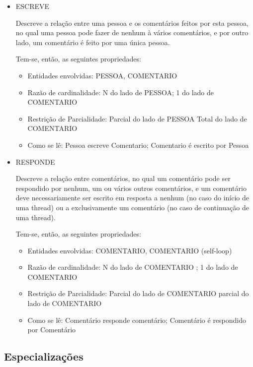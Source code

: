 \begin{itemize}
				\item ESCREVE

Descreve a relação entre uma pessoa e os comentários feitos por esta pessoa, no qual uma pessoa pode fazer de nenhum à vários comentários, e por outro lado, um comentário é feito por uma única pessoa.

Tem-se, então, as seguintes propriedades:
\begin{itemize}

\item Entidades envolvidas: PESSOA, COMENTARIO
\item Razão de cardinalidade: N do lado de PESSOA; 1 do lado de COMENTARIO
\item Restrição de Parcialidade: Parcial do lado de PESSOA                        Total do lado de COMENTARIO
\item Como se lê: Pessoa escreve Comentario; Comentario é escrito por Pessoa
\end{itemize}
\end{itemize}

\begin{itemize}
				\item RESPONDE

Descreve a relação entre comentários, no qual um comentário pode ser respondido por nenhum, um ou vários outros comentários, e um comentário deve necessariamente ser escrito em resposta a nenhum (no caso do início de uma thread) ou a exclusivamente um comentário (no caso de continuação de uma thread).

Tem-se, então, as seguintes propriedades:
\begin{itemize}

\item Entidades envolvidas: COMENTARIO, COMENTARIO (self-loop)
\item Razão de cardinalidade:     N do lado de COMENTARIO                        ; 1 do lado de COMENTARIO
\item Restrição de Parcialidade: Parcial do lado de COMENTARIO                        parcial do lado de COMENTARIO
\item Como se lê: Comentário responde comentário; Comentário é respondido por Comentário
\end{itemize}
\end{itemize}

\subsection{Especializações}

